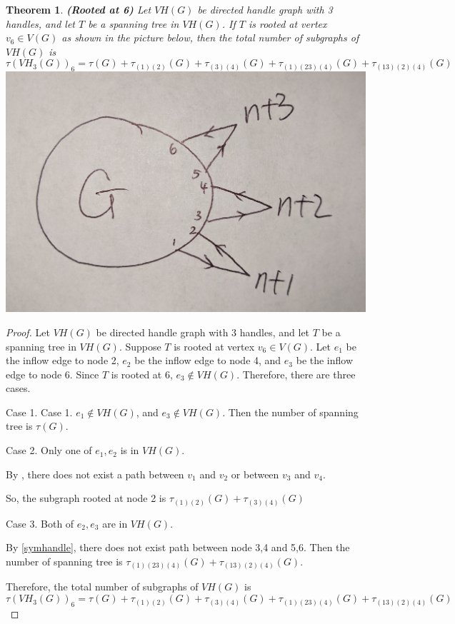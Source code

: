 \documentclass[twoside,11pt]{article}
\newtheorem{theorem}{Theorem}[section]
\numberwithin{equation}{section} \DeclareMathOperator{\Var}{Var}
\newcommand{\bpf}{\begin{proof}}
\newcommand{\epf}{\end{proof}}
\newcommand{\bthm}{\begin{theorem}}
\newcommand{\ethm}{\end{theorem}}
\begin{document}
\bthm
{\bf (Rooted at 6)}
Let $VH(G)$ be directed handle graph with 3 handles, and let $T$ be a spanning tree in $VH(G)$. If $T$ is rooted at vertex $v_6\in V(G)$ as shown in the picture below,
then the total number of subgraphs of $VH(G)$ is  
\[
\tau(VH_3(G))_6 = \tau(G) + \tau_{(1)(2)}(G)+ \tau_{(3)(4)}(G) + \tau_{(1)(23)(4)}(G)+ \tau_{(13)(2)(4)}(G)
\]
\includegraphics[scale=0.025]{graph3_1.jpg}
\ethm

\bpf
Let $VH(G)$ be directed handle graph with 3 handles, and let $T$ be a spanning tree in $VH(G)$. Suppose $T$ is rooted at vertex $v_6\in V(G)$. Let $e_1$ be the inflow edge to node 2, $e_2$ be the inflow edge to node 4, and $e_3$ be the inflow edge to node 6. Since $T$ is rooted at 6, $e_3 \notin VH(G)$. Therefore, there are three cases.

Case 1. Case 1. $e_1\notin VH(G)$, and $e_3\notin VH(G)$. Then the number of spanning tree is $\tau(G)$.

Case 2. Only one of $e_1, e_2$ is in $VH(G)$. 

By , there does not exist a path between $v_1$ and $v_2$ or between $v_3$ and $v_4$.

So, the subgraph rooted at node 2 is $\tau_{(1)(2)}(G)+ \tau_{(3)(4)}(G)$

Case 3. Both of $e_2, e_3$ are in $VH(G)$.

By \cref{symhandle}, there does not exist path between node 3,4 and 5,6. Then the number of spanning tree is $\tau_{(1)(23)(4)}(G)+ \tau_{(13)(2)(4)}(G)$.

Therefore, the total number of subgraphs of $VH(G)$ is  \[
\tau(VH_3(G))_6 = \tau(G) + \tau_{(1)(2)}(G)+ \tau_{(3)(4)}(G) + \tau_{(1)(23)(4)}(G)+ \tau_{(13)(2)(4)}(G)
\]
\epf
\end{document}
